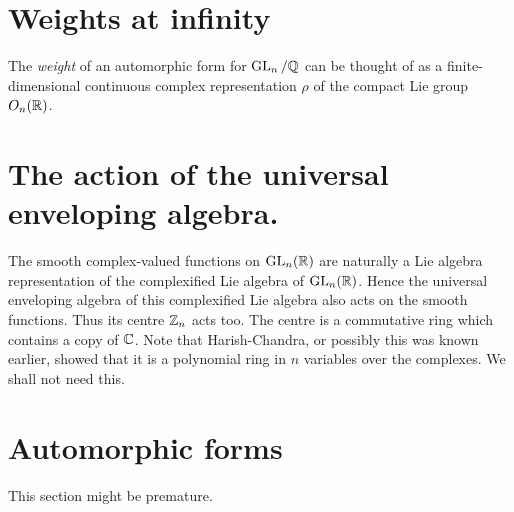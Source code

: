 \section{Weights at infinity}

The \emph{weight} of an automorphic form for $\operatorname{GL}_n/\mathbb{Q}$ can be thought of as a finite-dimensional
continuous complex representation $\rho$ of the compact Lie group $O_n(\mathbb{R})$.

\section{The action of the universal enveloping algebra.}

The smooth complex-valued functions on $\operatorname{GL}_n(\mathbb{R})$ are naturally a Lie algebra representation
of the complexified Lie algebra of $\operatorname{GL}_n(\mathbb{R})$. Hence the universal enveloping algebra of this
complexified Lie algebra also acts on the smooth functions. Thus its centre $\mathbb{Z}_n$ acts too. The
centre is a commutative ring which contains a copy of $\mathbb{C}$. Note that Harish-Chandra, or possibly
this was known earlier, showed that it is a polynomial ring in $n$ variables over the complexes.
We shall not need this.

\section{Automorphic forms}

This section might be premature.

